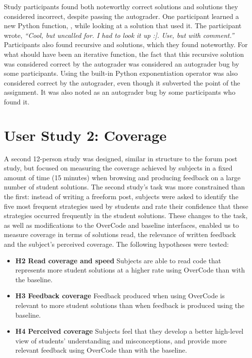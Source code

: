 Study participants found both noteworthy correct solutions and solutions they considered incorrect, despite passing the autograder. One participant learned a new Python function, , while looking at a solution that used it. The participant wrote, \textit{``Cool, but uncalled for. I had to look it up :]. Use, but with comment.''} Participants also found recursive  and  solutions, which they found noteworthy. For what should have been an iterative  function, the fact that this recursive solution was considered correct by the autograder was considered an autograder bug by some participants. Using the built-in Python exponentiation operator \codevar{**} was also considered correct by the autograder, even though it subverted the point of the assignment. It was also noted as an autograder bug by some participants who found it.
\section{User Study 2: Coverage}

A second 12-person study was designed, similar in structure to the forum post study, but focused on measuring the coverage achieved by subjects in a fixed amount of time (15 minutes) when browsing and producing feedback on a large number of student solutions. The second study's task was more constrained than the first: instead of writing a freeform post, subjects were asked to identify the five most frequent strategies used by students and rate their confidence that these strategies occurred frequently in the student solutions. These changes to the task, as well as modifications to the OverCode and baseline interfaces, enabled us to measure coverage in terms of solutions read, the relevance of written feedback and the subject's perceived coverage. The following hypotheses were tested:

\begin{itemize}
\item {\bf H2 Read coverage and speed} Subjects are able to read code that represents more student solutions at a higher rate using OverCode than with the baseline. 

\item {\bf H3 Feedback coverage} Feedback produced when using OverCode is relevant to more student solutions than when feedback is produced using the baseline.

\item {\bf H4 Perceived coverage} Subjects feel that they develop a better high-level view of students' understanding and misconceptions, and provide more relevant feedback using OverCode than with the baseline.

\end{itemize}


